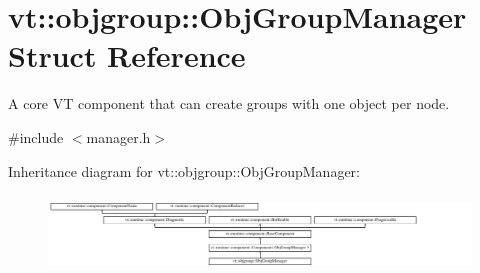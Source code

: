 \hypertarget{structvt_1_1objgroup_1_1_obj_group_manager}{}\section{vt\+:\+:objgroup\+:\+:Obj\+Group\+Manager Struct Reference}
\label{structvt_1_1objgroup_1_1_obj_group_manager}


A core VT component that can create groups with one object per node.  




{\ttfamily \#include $<$manager.\+h$>$}

Inheritance diagram for vt\+:\+:objgroup\+:\+:Obj\+Group\+Manager\+:\begin{figure}[H]
\begin{center}
\leavevmode
\includegraphics[height=2.040816cm]{structvt_1_1objgroup_1_1_obj_group_manager}
\end{center}
\end{figure}
